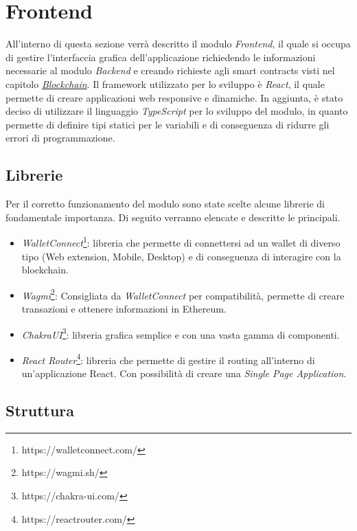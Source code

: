 \section{Frontend}

All'interno di questa sezione verrà descritto il modulo \textit{Frontend}, il quale si occupa di gestire l'interfaccia grafica dell'applicazione richiedendo le informazioni necessarie al modulo \textit{Backend} e creando richieste agli smart contracts visti nel capitolo \hyperref[sec:blockchain-module]{\textit{Blockchain}}.
Il framework utilizzato per lo sviluppo è \textit{React}, il quale permette di creare applicazioni web responsive e dinamiche. In aggiunta, è stato deciso di utilizzare il linguaggio \textit{TypeScript} per lo sviluppo del modulo, in quanto permette di definire tipi statici per le variabili e di conseguenza di ridurre gli errori di programmazione.

\subsection{Librerie}

Per il corretto funzionamento del modulo sono state scelte alcune librerie di fondamentale importanza. Di seguito verranno elencate e descritte le principali.

\begin{itemize}
    \item \textit{WalletConnect}\footnote{https://walletconnect.com/}: libreria che permette di connettersi ad un wallet di diverso tipo (Web extension, Mobile, Desktop) e di conseguenza di interagire con la blockchain.
    \item \textit{Wagmi}\footnote{https://wagmi.sh/}: Consigliata da \textit{WalletConnect} per compatibilità, permette di creare transazioni e ottenere informazioni in Ethereum.
    \item \textit{ChakraUI}\footnote{https://chakra-ui.com/}: libreria grafica semplice e con una vasta gamma di componenti.
    \item \textit{React Router}\footnote{https://reactrouter.com/}: libreria che permette di gestire il routing all'interno di un'applicazione React. Con possibilità di creare una
    \textit{Single Page Application}.
\end{itemize}

\subsection{Struttura}
\label{sec:frontend-structure}

